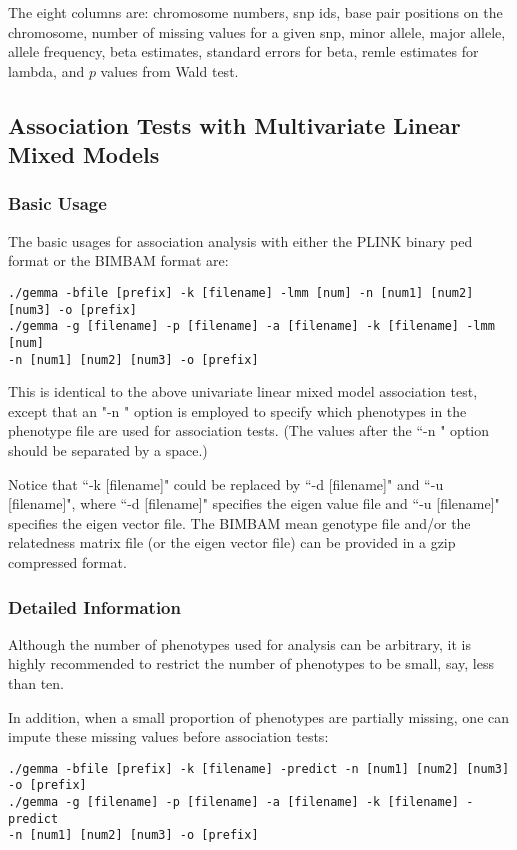 \documentclass[11pt]{article}
\begin{document}
The eight columns are: chromosome numbers, snp ids, base pair positions on the chromosome, number of missing values for a given snp, minor allele, major allele, allele frequency, beta estimates, standard errors for beta, remle estimates for lambda, and $p$ values from Wald test. 


\subsection{Association Tests with Multivariate Linear Mixed Models}
\subsubsection{Basic Usage}
The basic usages for association analysis with either the PLINK binary ped format or the BIMBAM format are:
\begin{verbatim}
./gemma -bfile [prefix] -k [filename] -lmm [num] -n [num1] [num2] [num3] -o [prefix]
./gemma -g [filename] -p [filename] -a [filename] -k [filename] -lmm [num] 
-n [num1] [num2] [num3] -o [prefix]
\end{verbatim}
This is identical to the above univariate linear mixed model association test, except that an "-n " option is employed to specify which phenotypes in the phenotype file are used for association tests.  (The values after the ``-n " option should be separated by a space.) 

Notice that ``-k [filename]" could be replaced by ``-d [filename]" and ``-u [filename]", where ``-d [filename]" specifies the eigen value file and ``-u [filename]" specifies the eigen vector file. The BIMBAM mean genotype file and/or the relatedness matrix file (or the eigen vector file) can be provided in a gzip compressed format.

\subsubsection{Detailed Information}
Although the number of phenotypes used for analysis can be arbitrary, it is highly recommended to restrict the number of phenotypes to be small, say, less than ten. 

In addition, when a small proportion of phenotypes are partially missing, one can impute these missing values before association tests:
\begin{verbatim}
./gemma -bfile [prefix] -k [filename] -predict -n [num1] [num2] [num3] -o [prefix]
./gemma -g [filename] -p [filename] -a [filename] -k [filename] -predict 
-n [num1] [num2] [num3] -o [prefix]
\end{verbatim}
\end{document}
